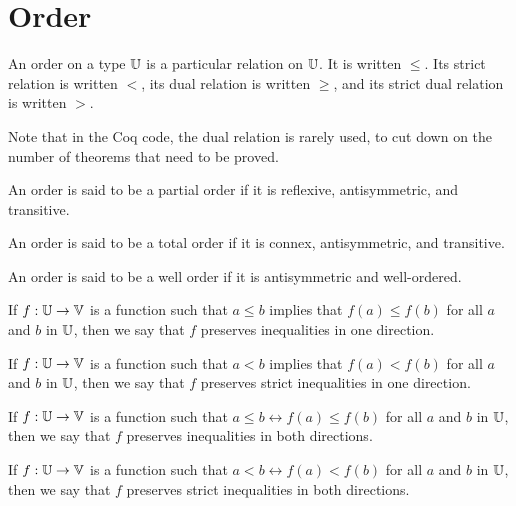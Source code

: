 \documentclass[../math.tex]{subfiles}
\begin{document}
\section{Order}

\begin{class}
    An order on a type $\mathbb{U}$ is a particular relation on $\mathbb{U}$.  It is written
    $\leq$.  Its strict relation is written $<$, its dual relation is written
    $\geq$, and its strict dual relation is written $>$.
\end{class}

Note that in the Coq code, the dual relation is rarely used, to cut down on the
number of theorems that need to be proved.

\begin{class}
    An order is said to be a partial order if it is reflexive, antisymmetric,
    and transitive.
\end{class}

\begin{class}
    An order is said to be a total order if it is connex, antisymmetric, and
    transitive.
\end{class}

\begin{class}
    An order is said to be a well order if it is antisymmetric and well-ordered.
\end{class}

\begin{class}
    If $f : \mathbb{U} \to \mathbb{V}$ is a function such that $a \leq b$ implies that $f(a)
    \leq f(b)$ for all $a$ and $b$ in $\mathbb{U}$, then we say that $f$ preserves
    inequalities in one direction.
\end{class}

\begin{class}
    If $f : \mathbb{U} \to \mathbb{V}$ is a function such that $a < b$ implies that $f(a) <
    f(b)$ for all $a$ and $b$ in $\mathbb{U}$, then we say that $f$ preserves strict
    inequalities in one direction.
\end{class}

\begin{class}
    If $f : \mathbb{U} \to \mathbb{V}$ is a function such that $a \leq b \leftrightarrow f(a)
    \leq f(b)$ for all $a$ and $b$ in $\mathbb{U}$, then we say that $f$ preserves
    inequalities in both directions.
\end{class}

\begin{class}
    If $f : \mathbb{U} \to \mathbb{V}$ is a function such that $a < b \leftrightarrow f(a) <
    f(b)$ for all $a$ and $b$ in $\mathbb{U}$, then we say that $f$ preserves strict
    inequalities in both directions.
\end{class}
\end{document}
